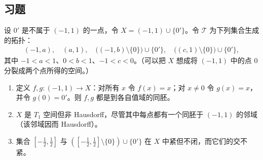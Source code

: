 \documentclass[../../main.tex]{subfiles}%
\begin{document}
\subsection*{习题}
\begin{exercise}\label{exercise:ch04-doubled-origin}
设 $0'$ 是不属于 $(-1,1)$ 的一点，令 $X=(-1,1)\cup\{0'\}$。令 $\mathcal T$ 为下列集合生成的拓扑：
\begin{align*}
(-1,a),\quad(a,1),\quad
\bigl((-1,b)\setminus\{0\}\bigr)\cup\{0'\},\quad
\bigl((c,1)\setminus\{0\}\bigr)\cup\{0'\},
\end{align*}
其中 $-1<a<1$、$0<b<1$、$-1<c<0$。（可以把 $X$ 想成将 $(-1,1)$ 中的点 $0$ 分裂成两个点所得的空间。）
\begin{enumerate}
\item\label{item:ch04-doubled-origin-charts} 定义 $f,g:(-1,1)\to X$：对所有 $x$ 令 $f(x)=x$；对 $x\ne0$ 令 $g(x)=x$，并令 $g(0)=0'$。则 $f,g$ 都是到各自值域的同胚。
\item\label{item:ch04-doubled-origin-separation} $X$ 是 $T_1$ 空间但非 Hausdorff，尽管其中每点都有一个同胚于 $(-1,1)$ 的邻域（该邻域因而 Hausdorff）。
\item\label{item:ch04-doubled-origin-compacts} 集合 $[-\tfrac12,\tfrac12]$ 与 $([-\tfrac12,\tfrac12]\setminus\{0\})\cup\{0'\}$ 在 $X$ 中紧但不闭，而它们的交不紧。
\end{enumerate}
\end{exercise}
\end{document}
